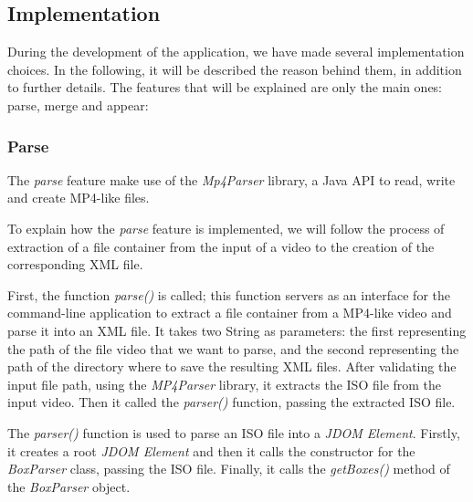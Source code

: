 \subsection{Implementation} 
 
During the development of the application, we have made several implementation choices. In the following, it will be described the reason behind them, in addition to further details. The features that will be explained are only the main ones: parse, merge and appear:

\subsubsection{Parse}

The \emph{parse} feature make use of the \emph{Mp4Parser} library, a Java API to read, write and create MP4-like files.

To explain how the \emph{parse} feature is implemented, we will follow the process of extraction of a file container from the input of a video to the creation of the corresponding XML file.

First, the function \emph{parse()} is called; this function servers as an interface for the command-line application to extract a file container from a MP4-like video and parse it into an XML file. It takes two String as parameters: the first representing the path of the file video that we want to parse, and the second representing the path of the directory where to save the resulting XML files. After validating the input file path, using the \emph{MP4Parser} library, it extracts the ISO file from the input video. Then it called the \emph{parser()} function, passing the extracted ISO file.

The \emph{parser()} function is used to parse an ISO file into a \emph{JDOM Element}. Firstly, it creates a root \emph{JDOM Element} and then it calls the constructor for the \emph{BoxParser} class, passing the ISO file. Finally, it calls the \emph{getBoxes()} method of the \emph{BoxParser} object.

